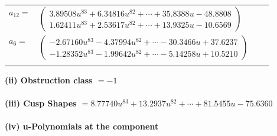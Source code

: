 \documentclass[1p]{elsarticle_modified}
\theoremstyle{definition}
\begin{document}
\begin{tabular}{m{7pt} m{180pt} m{7pt} m{180pt} }
\flushright $a_{12}=$&$\begin{pmatrix}3.89508 u^{83}+6.34816 u^{82}+\cdots+35.8388 u-48.8808\\1.62411 u^{83}+2.53617 u^{82}+\cdots+13.9325 u-10.6569\end{pmatrix}$ \\
\flushright $a_{6}=$&$\begin{pmatrix}-2.67160 u^{83}-4.37994 u^{82}+\cdots-30.3466 u+37.6237\\-1.28352 u^{83}-1.99642 u^{82}+\cdots-5.14258 u+10.5210\end{pmatrix}$\\&\end{tabular}
\flushleft \textbf{(ii) Obstruction class $= -1$}\\~\\
\flushleft \textbf{(iii) Cusp Shapes $= 8.77740 u^{83}+13.2937 u^{82}+\cdots+81.5455 u-75.6360$}\\~\\
\newpage\renewcommand{\arraystretch}{1}
\flushleft \textbf{(iv) u-Polynomials at the component}\newline \\
\end{document}
